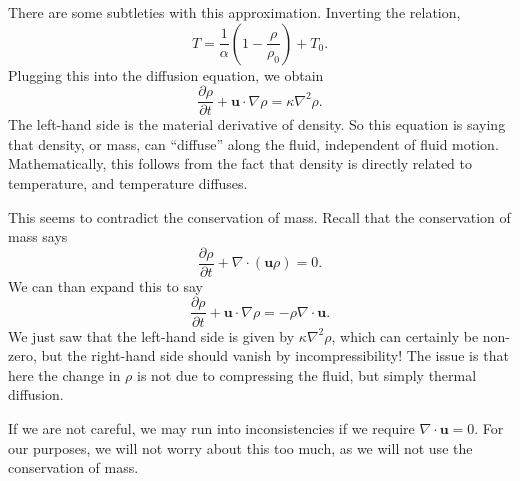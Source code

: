 \documentclass[a4paper]{article}
\begin{document}
There are some subtleties with this approximation. Inverting the relation,
\[
  T = \frac{1}{\alpha}\left(1 - \frac{\rho}{\rho_0}\right) + T_0.
\]
Plugging this into the diffusion equation, we obtain
\[
  \frac{\partial \rho}{\partial t} + \mathbf{u} \cdot \nabla \rho = \kappa \nabla^2 \rho.
\]
The left-hand side is the material derivative of density. So this equation is saying that density, or mass, can ``diffuse'' along the fluid, independent of fluid motion. Mathematically, this follows from the fact that density is directly related to temperature, and temperature diffuses.

This seems to contradict the conservation of mass. Recall that the conservation of mass says
\[
  \frac{\partial \rho}{\partial t} + \nabla \cdot (\mathbf{u} \rho) = 0.
\]
We can than expand this to say
\[
  \frac{\partial \rho}{\partial t} + \mathbf{u} \cdot \nabla \rho = - \rho \nabla \cdot \mathbf{u}.
\]
We just saw that the left-hand side is given by $\kappa \nabla^2 \rho$, which can certainly be non-zero, but the right-hand side should vanish by incompressibility! The issue is that here the change in $\rho$ is not due to compressing the fluid, but simply thermal diffusion.

If we are not careful, we may run into inconsistencies if we require $\nabla \cdot \mathbf{u} = 0$. For our purposes, we will not worry about this too much, as we will not use the conservation of mass.
\end{document}
